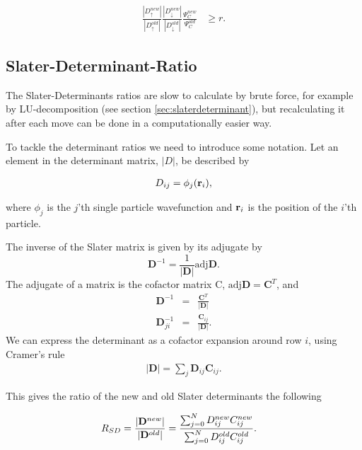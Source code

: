 		\begin{align}
			\frac{|D_\uparrow^{new}|}{|D_\uparrow^{old}|} \frac{|D_\downarrow^{new}|}{|D_\downarrow^{old}|} \frac{\Psi_C^{new}}{  \Psi_C^{old}} &\ge r.
		\end{align} 

	\subsection{Slater-Determinant-Ratio}
		\label{sec:slater_ratio}
		The Slater-Determinants ratios are slow to calculate by brute force, for example by LU-decomposition (see section \ref{sec:slaterdeterminant}), but recalculating it after each move can be done in a computationally easier way. 

		To tackle the determinant ratios we need to introduce some notation. Let an element in the determinant matrix, \(|D|\), be described by

		\begin{align}
			D_{ij} = \phi_j(\vb{r}_i),
		\end{align}

		where \(\phi_j\) is the $j$'th single particle wavefunction and \( \vb{r}_i \) is the position of the $i$'th particle.

		The inverse of the Slater matrix is given by its adjugate by
		\[
		\mathbf{D}^{-1}=\frac{1}{\left|\mathbf{D}\right|}\mbox{adj}\mathbf{D}.
		\]
		The adjugate of a matrix is the cofactor matrix C, $\mbox{adj}\mathbf{D}=\mathbf{C}^T$, and 
		\begin{eqnarray*}
			\mathbf{D}^{-1} & = & \frac{\mathbf{C}^{T}}{\left|\mathbf{D}\right|}\\
			\mathbf{D}_{ji}^{-1} & = & \frac{\mathbf{C}_{ij}}{\left|\mathbf{D}\right|}.
		\end{eqnarray*}
		We can express the determinant as a cofactor expansion around row $i$, using Cramer's rule
		\begin{align} \label{eq:inverseMatrix}
		\left|\mathbf{D}\right|=\sum_{j}\mathbf{D}_{ij}\mathbf{C}_{ij}.
		\end{align}
		
		This gives the ratio of the new and old Slater determinants the following

		\begin{align}
			R_{SD} &= \frac{|\vb{D}^{new}|}{|\vb{D}^{old}|} = \frac{\sum_{j=0}^N D_{ij}^{new} C_{ij}^{new} }{\sum_{j=0}^N D_{ij}^{old} C_{ij}^{old} }.
		\end{align}

